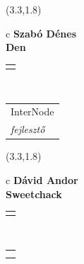 \documentclass[11pt]{article}
\begin{document}
\makebox(3.3,1.8){
  \renewcommand\arraystretch{1.3}
  \begin{tabular}[c]{c}
    \hspace{8.5mm}
    \LARGE\bf{ Szabó Dénes }\\
    \hspace{8.5mm}
    \Large{ Den }\\
    \renewcommand\arraystretch{3}
    \begin{tabular}[c]{c}
      \centering
      \fontfamily{phv}\selectfont{
        \textbf{
          \textsc{
            \scriptsize{
            \color{Bright}{ Ismerkedő }\color{Dark}{ Webmester }\color{Dark}{ Sminkmester }\color{Dark}{ Programozó }
            }
          }
        }
      }
    \end{tabular}
    \\
    \renewcommand\arraystretch{1}
    \begin{tabular}{p{3.3in}}
      \hspace{.7cm}InterNode\\
      \hspace{.7cm}\emph{ fejlesztő }\\
    \end{tabular}
  \end{tabular}
}

\makebox(3.3,1.8){
  \renewcommand\arraystretch{1.3}
  \begin{tabular}[c]{c}
    \hspace{8.5mm}
    \LARGE\bf{ Dávid Andor }\\
    \hspace{8.5mm}
    \Large{ Sweetchack }\\
    \renewcommand\arraystretch{3}
    \begin{tabular}[c]{c}
      \centering
      \fontfamily{phv}\selectfont{
        \textbf{
          \textsc{
            \scriptsize{
            \color{Bright}{ Ismerkedő }\color{Bright}{ Webmester }\color{Bright}{ Sminkmester }\color{Dark}{ Programozó }
            }
          }
        }
      }
    \end{tabular}
    \\
    \renewcommand\arraystretch{1}
    \begin{tabular}{p{3.3in}}
      \hspace{.7cm}\\
      \hspace{.7cm}\emph{  }\\
    \end{tabular}
  \end{tabular}
}
\end{document}
